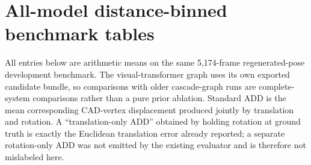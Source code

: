 \documentclass[11pt]{article}
\begin{document}
\section{All-model distance-binned benchmark tables}
All entries below are arithmetic means on the same 5,174-frame regenerated-pose development benchmark.  The visual-transformer graph uses its own exported candidate bundle, so comparisons with older cascade-graph runs are complete-system comparisons rather than a pure prior ablation.  Standard ADD is the mean corresponding CAD-vertex displacement produced jointly by translation and rotation.  A ``translation-only ADD'' obtained by holding rotation at ground truth is exactly the Euclidean translation error already reported; a separate rotation-only ADD was not emitted by the existing evaluator and is therefore not mislabeled here.
\end{document}
